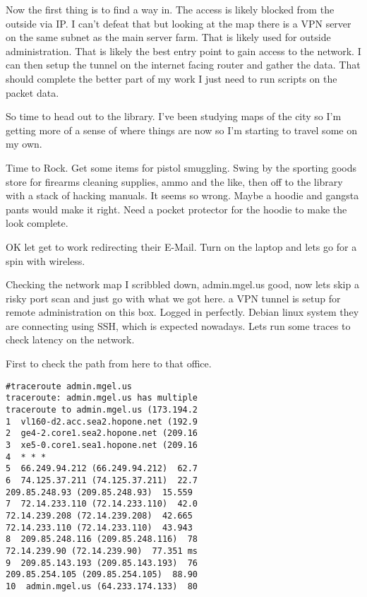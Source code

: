 Now the first thing is to find a way in. The access is likely blocked from the outside via IP. I can't defeat that but looking at the map there is a VPN server on the same subnet as the main server farm. That is likely used for outside administration. That is likely the best entry point to gain access to the network. I can then setup the tunnel on the internet facing router and gather the data. That should complete the better part of my work I just need to run scripts on the packet data.

So time to head out to the library. I've been studying maps of the city so I'm getting more of a sense of where things are now so I'm starting to travel some on my own. 

Time to Rock. Get some items for pistol smuggling. Swing by the sporting goods store for firearms cleaning supplies, ammo and the like, then off to the library with a stack of hacking manuals. It seems so wrong. Maybe a hoodie and gangsta pants would make it right. Need a pocket protector for the hoodie to make the look complete.

OK let get to work redirecting their E-Mail. Turn on the laptop and lets go for a spin with wireless.

Checking the network map I scribbled down, admin.mgel.us good, now lets skip a risky port scan and just go with what we got here. a VPN tunnel is setup for remote administration on this box. Logged in perfectly. Debian linux system they are connecting using SSH, which is expected nowadays. Lets run some traces to check latency on the network.\\
\bigskip

First to check the path from here to that office.

\begin{verbatim}
#traceroute admin.mgel.us
traceroute: admin.mgel.us has multiple
traceroute to admin.mgel.us (173.194.2
1  vl160-d2.acc.sea2.hopone.net (192.9
2  ge4-2.core1.sea2.hopone.net (209.16
3  xe5-0.core1.sea1.hopone.net (209.16
4  * * *
5  66.249.94.212 (66.249.94.212)  62.7
6  74.125.37.211 (74.125.37.211)  22.7
209.85.248.93 (209.85.248.93)  15.559 
7  72.14.233.110 (72.14.233.110)  42.0
72.14.239.208 (72.14.239.208)  42.665 
72.14.233.110 (72.14.233.110)  43.943 
8  209.85.248.116 (209.85.248.116)  78
72.14.239.90 (72.14.239.90)  77.351 ms
9  209.85.143.193 (209.85.143.193)  76
209.85.254.105 (209.85.254.105)  88.90
10  admin.mgel.us (64.233.174.133)  80	
\end{verbatim}
\medskip

